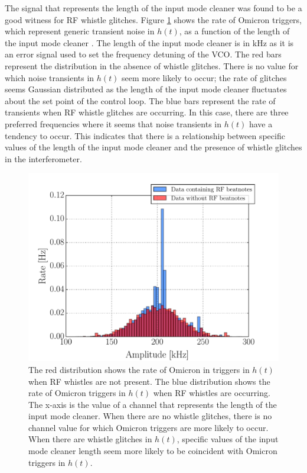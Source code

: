 The signal that represents the length of the input mode cleaner was found to 
be a good witness for RF whistle glitches. Figure \ref{fig:darm-whistle-hist} 
shows the rate of Omicron triggers, which represent generic transient noise in 
$h(t)$, as a function of the length of the input mode cleaner \cite{Nuttall:2015dqa}. 
The length of 
the input mode cleaner is in kHz as it is an error signal used to set the 
frequency detuning of the VCO. The red bars represent the distribution in 
the absence of whistle glitches. There is no value for which noise transients in 
$h(t)$ seem more likely to occur; the rate of glitches seems Gaussian distributed 
as the length of the input mode cleaner fluctuates about the set point of the 
control loop. The blue bars represent the rate of transients 
when RF whistle glitches are occurring. In this case, there are three preferred 
frequencies where it seems that noise transients in $h(t)$ have a tendency to 
occur. This indicates that there is a relationship between specific values of 
the length of the input mode cleaner and the presence of whistle glitches in the 
interferometer. 

\begin{figure}[ht!]%
\includegraphics[width=\textwidth]{figures/detchar/Rate_Histogram_Whistles_LLO}
\caption[DARM glitch histograms with and without RF whistles]{The red distribution %
         shows the rate of Omicron in triggers in $h(t)$ when RF whistles are not %
         present. The blue distribution shows the rate of Omicron triggers in $h(t)$ %
         when RF whistles are occurring. The x-axis is the value of a channel that %
         represents the length of the input mode cleaner. When there are no whistle %
         glitches, there is no channel value for which Omicron triggers are more %
         likely to occur. When there are whistle glitches in $h(t)$, specific %
         values of the input mode cleaner length seem more likely to be coincident %
         with Omicron triggers in $h(t)$.}
\label{fig:darm-whistle-hist}
\end{figure}

